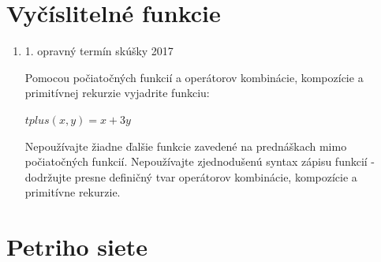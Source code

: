 \documentclass[]{article}
\begin{document}
	\section{Vyčíslitelné funkcie}
	
	\begin{enumerate}
		\item 1. opravný termín skúšky 2017
		
		Pomocou počiatočných funkcií a operátorov kombinácie, kompozície a primitívnej rekurzie vyjadrite funkciu:
		
		$tplus(x,y) = x + 3y$
		
		Nepoužívajte žiadne ďalšie funkcie zavedené na prednáškach mimo počiatočných funkcií. Nepoužívajte zjednodušenú syntax zápisu funkcií \-- dodržujte presne definičný tvar operátorov kombinácie, kompozície a primitívne rekurzie.
	\end{enumerate}

	\section{Petriho siete}
	
\end{document}
